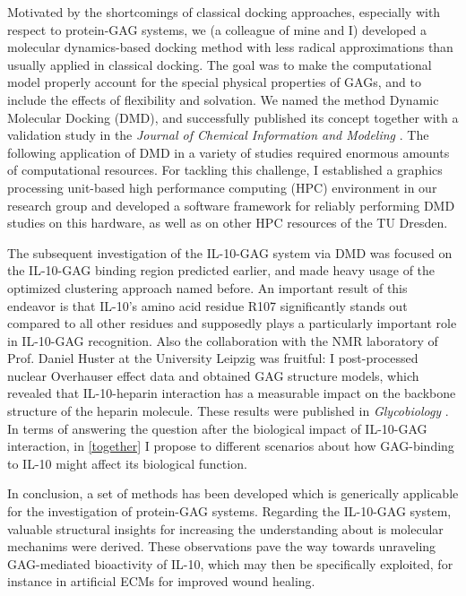 Motivated by the shortcomings of classical docking approaches, especially with
respect to protein-GAG systems, we (a colleague of mine and I) developed a
molecular dynamics-based docking method with less radical approximations than
usually applied in classical docking. The goal was to make the computational
model properly account for the special physical properties of GAGs, and to
include the effects of flexibility and solvation. We named the method Dynamic
Molecular Docking (DMD), and successfully published its concept together with a
validation study in the \textit{Journal of Chemical Information and
Modeling} \cite{dmd_samsonov_gehrcke_2014}. The following application of DMD in a
variety of studies required enormous amounts of computational resources. For
tackling this challenge, I established a graphics processing unit-based high
performance computing (HPC) environment in our research group and developed a
software framework for reliably performing DMD studies on this hardware, as well
as on other HPC resources of the TU Dresden.

The subsequent investigation of the IL-10-GAG system via DMD was focused on the
IL-10-GAG binding region predicted earlier, and made heavy usage of the
optimized clustering approach named before. An important result of this endeavor
is that IL-10's amino acid residue R107 significantly stands out compared to all
other residues and supposedly plays a particularly important role in IL-10-GAG
recognition. Also the collaboration with the NMR laboratory of Prof. Daniel
Huster at the University Leipzig was fruitful: I post-processed nuclear
Overhauser effect data and obtained GAG structure models, which revealed that
IL-10-heparin interaction has a measurable impact on the backbone structure of
the heparin molecule. These results were published in \textit{Glycobiology}
\cite{kuenze_gehrcke_2014}. In terms of answering the question after the
biological impact of IL-10-GAG interaction, in \cref{together} I propose to
different scenarios about how GAG-binding to IL-10 might affect its biological
function.

In conclusion, a set of methods has been developed which is generically
applicable for the investigation of protein-GAG systems. Regarding the IL-10-GAG
system, valuable structural insights for increasing the understanding about is
molecular mechanims were derived. These observations pave the way towards
unraveling GAG-mediated bioactivity of IL-10, which may then be specifically
exploited, for instance in artificial ECMs for improved wound healing.
